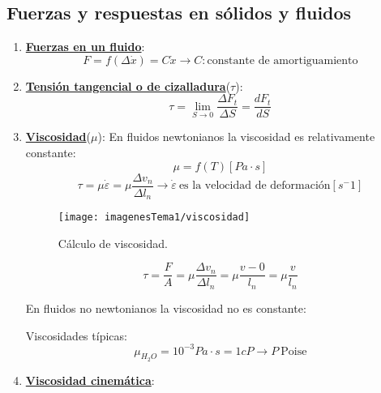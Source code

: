 \subsection{Fuerzas y respuestas en sólidos y fluidos}
\begin{enumerate}
	\item \underline{\textbf{Fuerzas en un fluido}}:
	\[F=f(\Delta \dot{x})=C\dot{x} \rightarrow C: \text{constante de amortiguamiento}\]
	
	\item \underline{\textbf{Tensión tangencial o de cizalladura}}($\tau$):
	\[\tau=\lim_{{S \to 0}} \frac{\Delta F_t}{\Delta S}=\frac{dF_t}{dS}\]
	\item \underline{\textbf{Viscosidad}}($\mu$):
	En fluidos newtonianos la viscosidad es relativamente constante: 
	\[\mu=f(T) [Pa \cdot s]\]
	\[\tau =\mu \dot{\varepsilon} = \mu \frac{\Delta v_n}{\Delta l_n} \rightarrow \dot{\varepsilon}\ \text{es la velocidad de deformación} [s^-1]\]
\begin{figure}[H]
	\centering
	\texttt{[image: imagenesTema1/viscosidad]}
	\caption{Cálculo de viscosidad.}
	\label{fig:viscosidad}
\end{figure}

\[\tau =\frac{F}{A}=\mu \frac{\Delta v_n}{\Delta l_n} =\mu \frac{v - 0}{l_n}= \mu \frac{v}{l_n}\]
	 
	 En fluidos no newtonianos la viscosidad no es constante:
	 
	 
	 Viscosidades típicas:
	 \[\mu_{H_2O}=10^{-3} Pa \cdot s = 1cP \rightarrow P \ \text{Poise}\]
	
	\item \underline{\textbf{Viscosidad cinemática}}:
	

\end{enumerate}
